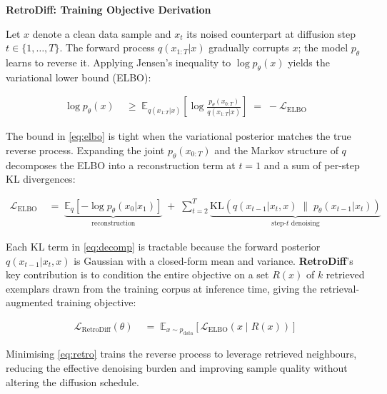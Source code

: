 \documentclass[11pt]{article}
\begin{document}
\begin{center}
  {\large\bfseries RetroDiff: Training Objective Derivation}
\end{center}

\medskip

\noindent
Let $x$ denote a clean data sample and $x_t$ its noised counterpart at diffusion step $t \in \{1,\ldots,T\}$.
The forward process $q(x_{1:T}|x)$ gradually corrupts $x$; the model $p_\theta$ learns to reverse it.
Applying Jensen's inequality to $\log p_\theta(x)$ yields the variational lower bound (ELBO):

\begin{align}
  \log p_\theta(x)
    &\;\geq\;
    \mathbb{E}_{q(x_{1:T}|x)}\!\left[\log\frac{p_\theta(x_{0:T})}{q(x_{1:T}|x)}\right]
    \;=\; -\mathcal{L}_{\mathrm{ELBO}}
  \label{eq:elbo}
\end{align}

\noindent
The bound in \eqref{eq:elbo} is tight when the variational posterior matches the true reverse process.
Expanding the joint $p_\theta(x_{0:T})$ and the Markov structure of $q$ decomposes the ELBO into a
reconstruction term at $t{=}1$ and a sum of per-step KL divergences:

\begin{align}
  \mathcal{L}_{\mathrm{ELBO}}
    &\;=\;
    \underbrace{\mathbb{E}_q\!\left[-\log p_\theta(x_0|x_1)\right]}_{\text{reconstruction}}
    \;+\;
    \sum_{t=2}^{T}
    \underbrace{\mathrm{KL}\!\left(q(x_{t-1}|x_t,x)\;\|\;p_\theta(x_{t-1}|x_t)\right)}_{\text{step-}t\text{ denoising}}
  \label{eq:decomp}
\end{align}

\noindent
Each KL term in \eqref{eq:decomp} is tractable because the forward posterior
$q(x_{t-1}|x_t,x)$ is Gaussian with a closed-form mean and variance.
\textbf{RetroDiff}'s key contribution is to condition the entire objective on a set
$R(x)$ of $k$ retrieved exemplars drawn from the training corpus at inference time,
giving the retrieval-augmented training objective:

\begin{align}
  \mathcal{L}_{\mathrm{RetroDiff}}(\theta)
    &\;=\;
    \mathbb{E}_{x \sim p_{\mathrm{data}}}\!\left[
      \mathcal{L}_{\mathrm{ELBO}}\!\left(x \;\big|\; R(x)\right)
    \right]
  \label{eq:retro}
\end{align}

\noindent
Minimising \eqref{eq:retro} trains the reverse process to leverage retrieved neighbours,
reducing the effective denoising burden and improving sample quality without altering
the diffusion schedule.
\end{document}
